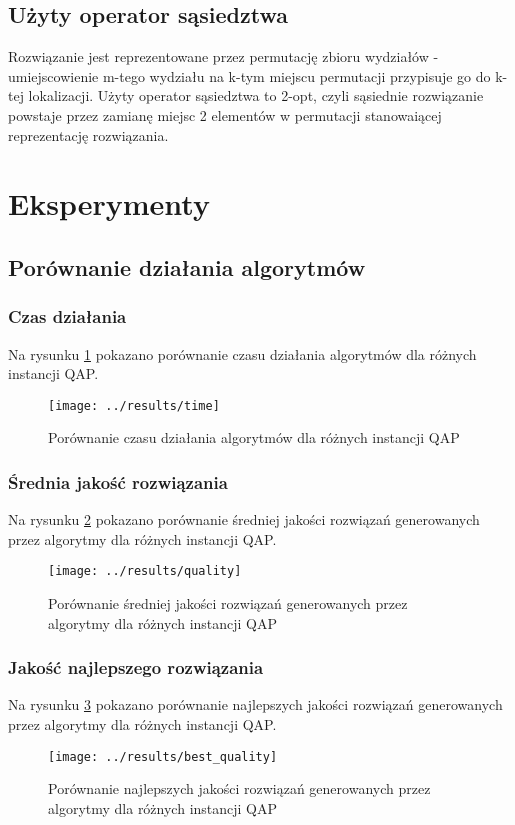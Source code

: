 \documentclass{article}
\begin{document}
	\subsection{Użyty operator sąsiedztwa}
	Rozwiązanie jest reprezentowane przez permutację zbioru wydziałów - umiejscowienie m-tego wydziału na k-tym miejscu permutacji przypisuje go do k-tej lokalizacji.
	Użyty operator sąsiedztwa to 2-opt, czyli sąsiednie rozwiązanie powstaje przez zamianę miejsc 2 elementów w permutacji stanowaiącej reprezentację rozwiązania.

\section{Eksperymenty}
	\subsection{Porównanie działania algorytmów}
		\subsubsection{Czas działania}Na rysunku \ref{fig:time} pokazano porównanie czasu działania algorytmów dla różnych instancji QAP.
			\begin{figure}[h]
				\texttt{[image: ../results/time]}
				\caption{Porównanie czasu działania algorytmów dla różnych instancji QAP\label{fig:time}}
			\end{figure}

		\subsubsection{Średnia jakość rozwiązania}Na rysunku \ref{fig:quality} pokazano porównanie średniej jakości rozwiązań generowanych przez algorytmy dla różnych instancji QAP.
			\begin{figure}[h]
				\texttt{[image: ../results/quality]}
				\caption{Porównanie średniej jakości rozwiązań generowanych przez algorytmy dla różnych instancji QAP\label{fig:quality}}
			\end{figure}

		\subsubsection{Jakość najlepszego rozwiązania}Na rysunku \ref{fig:best_quality} pokazano porównanie najlepszych jakości rozwiązań generowanych przez algorytmy dla różnych instancji QAP.
		 	\begin{figure}[h]
				\texttt{[image: ../results/best\_quality]}
				\caption{Porównanie najlepszych jakości rozwiązań generowanych przez algorytmy dla różnych instancji QAP\label{fig:best_quality}}
			\end{figure}
\end{document}
